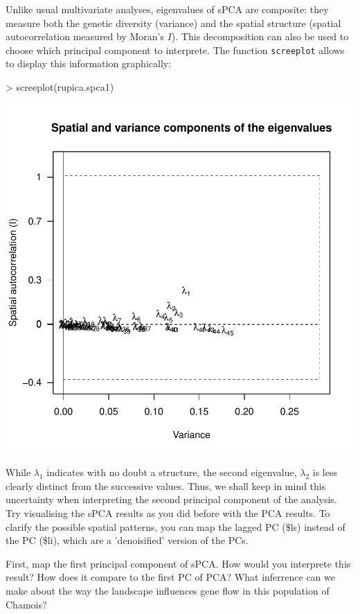 \documentclass{article}
\begin{document}
Unlike usual multivariate analyses, eigenvalues of sPCA are composite:
they measure both the genetic diversity (variance) and the spatial
structure (spatial autocorrelation measured by Moran's $I$).
This decomposition can also be used to choose which principal
component to interprete.
The function \texttt{screeplot} allows to display this information graphically:
\begin{Schunk}
\begin{Sinput}
> screeplot(rupica.spca1)
\end{Sinput}
\end{Schunk}
\includegraphics{figs/spca-044}

\noindent While $\lambda_1$ indicates with no doubt a structure, the
second eigenvalue, $\lambda_2$ is less clearly distinct from the
successive values.
Thus, we shall keep in mind this uncertainty when interpreting the
second principal component of the analysis.
\\


Try visualising the sPCA results as you did before with the PCA results.
To clarify the possible spatial patterns, you can map the lagged PC (\$ls) instead of the PC (\$li), which are a
'denoisified' version of the PCs.

First, map the first principal component of sPCA.
How would you interprete this result?
How does it compare to the first PC of PCA?
What inferrence can we make about the way the landscape
influences gene flow in this population of Chamois?
\end{document}
